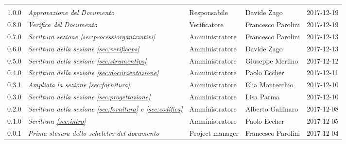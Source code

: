 \newpage 
\section*{}
\begin{table}[H]
	\centering
	\begin{tabular}{p{2cm}|C{4cm}|C{3cm}|R{3cm}|R{2cm}}

		
		
		 &  & &  & \\
		
		
		1.0.0  & \emph{Approvazione del Documento} & Responsabile & Davide Zago &  2017-12-19 \\
		\hline
		
		0.8.0  &  \emph{Verifica del Documento} & Verificatore & Francesco Parolini & 2017-12-19 \\
		\hline
		
		0.7.0  & \emph{Scrittura sezione \ref{sec:processiorganizzativi}}  & Amministratore & Francesco Parolini & 2017-12-13\\
		\hline
		
		0.6.0  & \emph{Scrittura della sezione \ref{sec:verificaps}} &  Amministratore & Davide Zago  & 2017-12-13 \\
		\hline
		
		0.5.0  & \emph{Scrittura della sezione \ref{sec:strumentips}} & Amministratore & Giuseppe Merlino & 2017-12-12\\
		\hline
		
	   	0.4.0  &\emph{Scrittura della sezione \ref{sec:documentazione}}& Amministratore & Paolo Eccher  & 2017-12-11 \\
		\hline
		
		 0.3.1 & \emph{Ampliata la sezione \ref{sec:fornitura}}& Amministratore & Elia Montecchio & 2017-12-10 \\
		\hline
		
		0.3.0 & \emph{Scrittura della sezione \ref{sec:progettazione}} & Amministratore & Lisa Parma & 2017-12-10 \\
		\hline
					
		0.2.0 & \emph{Scrittura della sezione \ref{sec:fornitura} e \ref{sec:codifica}} & Amministratore & Alberto Gallinaro & 2017-12-08 \\
		\hline
		
		0.1.0 & \emph{Scrittura \ref{sec:intro}} & Amministratore & Paolo Eccher & 2017-12-05 \\
		\hline
		
		0.0.1 &\emph{Prima stesura dello scheletro del documento} &  Project manager & Francesco Parolini & 2017-12-04 \\
	

	\end{tabular}
	
\end{table}


\clearpage